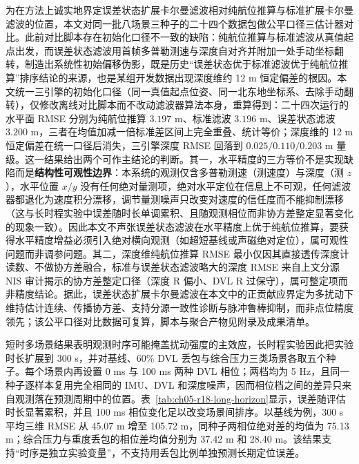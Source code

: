 为在方法上诚实地界定误差状态扩展卡尔曼滤波相对纯航位推算与标准扩展卡尔曼滤波的位置，本文对同一批八场景三种子的二十四个数据包做公平口径三估计器对比。此前对比脚本存在初始化口径不一致的缺陷：纯航位推算与标准滤波从真值起点出发，而误差状态滤波用首帧多普勒测速与深度自对齐并附加一处手动坐标翻转，制造出系统性初始偏移伪影，既是历史``误差状态优于标准滤波优于纯航位推算''排序结论的来源，也是某组开发数据出现深度维约 12 m 恒定偏差的根因。本文统一三引擎的初始化口径（同一真值起点位姿、同一北东地坐标系、去除手动翻转），仅修改离线对比脚本而不改动滤波器算法本身，重算得到：二十四次运行的水平面 RMSE 分别为纯航位推算 $3.197$ m、标准滤波 $3.196$ m、误差状态滤波 $3.200$ m，三者在均值加减一倍标准差区间上完全重叠、统计等价；深度维的 12 m 恒定偏差在统一口径后消失，三引擎深度 RMSE 回落到 $0.025/0.110/0.203$ m 量级。这一结果给出两个可作主结论的判断。其一，水平精度的三方等价不是实现缺陷而是\textbf{结构性可观性边界}：本系统的观测仅含多普勒测速（测速度）与深度（测 \(z\)），水平位置 \(x/y\) 没有任何绝对量测项，绝对水平定位在信息上不可观，任何滤波器都退化为速度积分漂移，调节量测噪声只改变对速度的信任度而不能抑制漂移（这与长时程实验中误差随时长单调累积、且随观测相位而非协方差整定显著变化的现象一致）。因此本文不声张误差状态滤波在水平精度上优于纯航位推算，要获得水平精度增益必须引入绝对横向观测（如超短基线或声磁绝对定位），属可观性问题而非调参问题。其二，深度维纯航位推算 RMSE 最小仅因其直接透传深度计读数、不做协方差融合，标准与误差状态滤波略大的深度 RMSE 来自上文分源 NIS 审计揭示的协方差整定口径（深度 R 偏小、DVL R 过保守），属可整定项而非精度结论。据此，误差状态扩展卡尔曼滤波在本文中的正贡献应界定为多扰动下维持估计连续、传播协方差、支持分源一致性诊断与脉冲鲁棒抑制，而非点位精度领先；该公平口径对比数据可复算，脚本与聚合产物见附录及成果清单。

短时多场景结果表明观测时序可能掩盖扰动强度的主效应，长时程实验因此把实验时长扩展到 300 s，并对基线、60\% DVL 丢包与综合压力三类场景各取五个种子。每个场景内再设置 0 ms 与 100 ms 两种 DVL 相位；两档均为 5 Hz，且同一种子逐样本复用完全相同的 IMU、DVL 和深度噪声，因而相位档之间的差异只来自观测落在预测周期中的位置。表~\ref{tab:ch05-r18-long-horizon}显示，误差随评估时长显著累积，并且 100 ms 相位变化足以改变场景间排序。以基线为例，300 s 平均三维 RMSE 从 45.07 m 增至 105.72 m，同种子两相位绝对差的均值为 75.13 m；综合压力与重度丢包的相位差均值分别为 37.42 m 和 28.40 m。该结果支持``时序是独立实验变量''，不支持用丢包比例单独预测长期定位误差。

